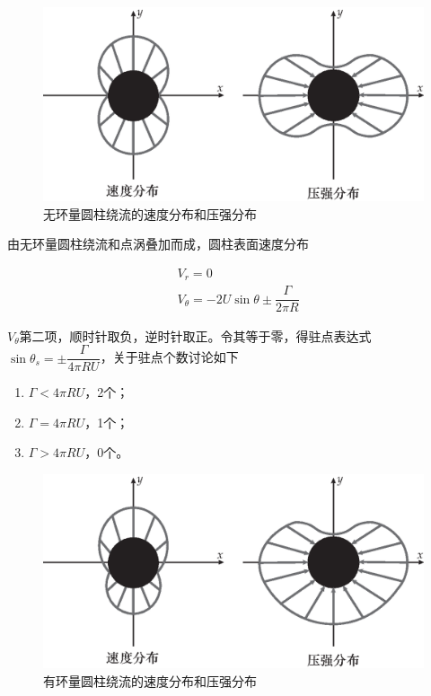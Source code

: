 \begin{figure}[H]
	\centering
	\includegraphics[scale=0.7]{figures/无环量.eps}
	\caption{无环量圆柱绕流的速度分布和压强分布}
\end{figure}


由无环量圆柱绕流和点涡叠加而成，圆柱表面速度分布

\begin{align*}
	&V_r = 0\\
	&V_{\theta} = -2U \sin \theta \pm \dfrac{\varGamma}{2\pi R}
\end{align*}

$V_{\theta}$第二项，顺时针取负，逆时针取正。令其等于零，得驻点表达式$\sin \theta_s = \pm \dfrac{\varGamma}{4\pi R U}$，关于驻点个数讨论如下

\begin{enumerate}
	\item $\varGamma < 4\pi R U$，2个；
	\item $\varGamma = 4\pi R U$，1个；
	\item $\varGamma > 4\pi R U$，0个。
\end{enumerate}

\begin{figure}[H]
	\centering
	\includegraphics[scale=0.7]{figures/有环量.eps}
	\caption{有环量圆柱绕流的速度分布和压强分布}
\end{figure}

